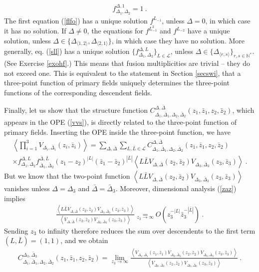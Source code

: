 \documentclass[12pt,a4paper,notitlepage]{report}
\newcommand \la {\left\langle}
\newcommand \ra {\right\rangle}
\newcommand \N {\mathbb{N}}
\numberwithin{equation}{section}
\theoremstyle{break}
\begin{document}
\begin{align}
 f^{\Delta,1}_{\Delta_1,\Delta_2} = 1\ .
\label{fo}
\end{align}
The first equation (\ref{flfo}) has a unique solution $f^{L_{-1}}$, unless $\Delta=0$, in which case it has no solution. If $\Delta \neq 0$, the equations for $f^{L_{-1}^2}$ and $f^{L_{-2}}$ have a unique solution, unless $\Delta \in \{\Delta_{\langle 1,2 \rangle}, \Delta_{\langle 2,1 \rangle}\}$, in which case they have no solution. More generally, eq. (\ref{sll}) has a unique solution $\{ f^{\Delta,L}_{\Delta_1,\Delta_2} \}_{L\in\mathcal{L}}$, unless $\Delta\in\{\Delta_{\langle r,s \rangle}\}_{r,s\in \N^*}$. 
(See Exercise \ref{exohf}.) This means that fusion multiplicities are trivial -- they do not exceed one. 
This is equivalent to the statement in Section \ref{secswi}, that a three-point function of primary fields uniquely determines the three-point functions of the corresponding descendent fields. 

Finally, let us show that the structure function $C_{\Delta_1,\bar{\Delta}_1,\Delta_2,\bar{\Delta}_2}^{\Delta,\bar{\Delta}}(z_1,\bar{z}_1,z_2,\bar{z}_2)$, which appears in the OPE (\ref{vvs}), is directly related to the three-point function of primary fields. Inserting the OPE inside the three-point function, we have 
\begin{multline}
 \la \prod_{i=1}^3 V_{\Delta_i,\bar{\Delta}_i}(z_i,\bar{z}_i) \ra = \sum_{\Delta,\bar{\Delta}}\sum_{L,\bar{L}\in \mathcal{L}} 
 C_{\Delta_1,\bar{\Delta}_1,\Delta_2,\bar{\Delta}_2}^{\Delta,\bar{\Delta}}(z_1,\bar{z}_1,z_2,\bar{z}_2)
\\ \times
 f_{\Delta_1,\Delta_2}^{\Delta,L} f_{\bar{\Delta}_1,\bar{\Delta}_2}^{\bar{\Delta},\bar{L}} (z_1-z_2)^{|L|} (\bar{z}_1-\bar{z}_2)^{|\bar{L}|}
 \la L\bar{L} V_{\Delta,\bar{\Delta}}(z_2,\bar{z}_2) V_{\Delta_3,\bar{\Delta}_3}(z_3,\bar{z}_3)\ra\ .
\end{multline}
But we know that the two-point function $\la L\bar{L} V_{\Delta,\bar{\Delta}}(z_2,\bar{z}_2) V_{\Delta_3,\bar{\Delta}_3}(z_3,\bar{z}_3)\ra$ vanishes unless $\Delta=\Delta_3$ and $\bar{\Delta}=\bar{\Delta}_3$. Moreover, dimensional analysis (\ref{zaz}) implies 
\begin{align}
 \frac{\la L\bar{L} V_{\Delta,\bar{\Delta}}(z_2,\bar{z}_2) V_{\Delta_3,\bar{\Delta}_3}(z_3,\bar{z}_3)\ra }{\la V_{\Delta,\bar{\Delta}}(z_2,\bar{z}_2) V_{\Delta_3,\bar{\Delta}_3}(z_3,\bar{z}_3)\ra } \underset{z_3\rightarrow \infty}{=} O\left(z_3^{-|L|}\bar{z}_3^{-|\bar{L}|}\right)\ .
\end{align}
Sending $z_3$ to infinity therefore reduces the sum over descendents to the first term $(L,\bar{L})=(1,1)$, and we obtain
\begin{align}
C_{\Delta_1,\bar{\Delta}_1,\Delta_2,\bar{\Delta}_2}^{\Delta_3,\bar{\Delta}_3}(z_1,\bar{z}_1,z_2,\bar{z}_2) =\underset{z_3\rightarrow \infty}{\lim} \frac{\la V_{\Delta_1,\bar{\Delta}_1}(z_1,\bar{z}_1) V_{\Delta_2,\bar{\Delta}_2}(z_2,\bar{z}_2)  V_{\Delta_3,\bar{\Delta}_3}(z_3,\bar{z}_3)\ra}{\la V_{\Delta_3,\bar{\Delta}_3}(z_2,\bar{z}_2)  V_{\Delta_3,\bar{\Delta}_3}(z_3,\bar{z}_3)\ra}\ .
\label{cftt}
\end{align}
\end{document}
